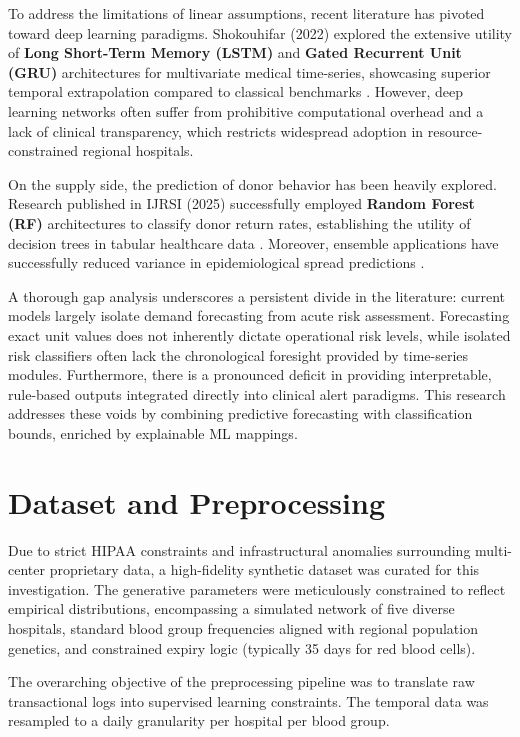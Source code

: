 \documentclass[conference]{IEEEtran}
\begin{document}
To address the limitations of linear assumptions, recent literature has pivoted toward deep learning paradigms. Shokouhifar (2022) explored the extensive utility of \textbf{Long Short-Term Memory (LSTM)} and \textbf{Gated Recurrent Unit (GRU)} architectures for multivariate medical time-series, showcasing superior temporal extrapolation compared to classical benchmarks \cite{b5}. However, deep learning networks often suffer from prohibitive computational overhead and a lack of clinical transparency, which restricts widespread adoption in resource-constrained regional hospitals.

On the supply side, the prediction of donor behavior has been heavily explored. Research published in IJRSI (2025) successfully employed \textbf{Random Forest (RF)} architectures to classify donor return rates, establishing the utility of decision trees in tabular healthcare data \cite{b6}. Moreover, ensemble applications have successfully reduced variance in epidemiological spread predictions \cite{b7}.

A thorough gap analysis underscores a persistent divide in the literature: current models largely isolate demand forecasting from acute risk assessment. Forecasting exact unit values does not inherently dictate operational risk levels, while isolated risk classifiers often lack the chronological foresight provided by time-series modules. Furthermore, there is a pronounced deficit in providing interpretable, rule-based outputs integrated directly into clinical alert paradigms. This research addresses these voids by combining predictive forecasting with classification bounds, enriched by explainable ML mappings.

\section{Dataset and Preprocessing}
Due to strict HIPAA constraints and infrastructural anomalies surrounding multi-center proprietary data, a high-fidelity synthetic dataset was curated for this investigation. The generative parameters were meticulously constrained to reflect empirical distributions, encompassing a simulated network of five diverse hospitals, standard blood group frequencies aligned with regional population genetics, and constrained expiry logic (typically 35 days for red blood cells).

The overarching objective of the preprocessing pipeline was to translate raw transactional logs into supervised learning constraints. The temporal data was resampled to a daily granularity per hospital per blood group.
\end{document}
